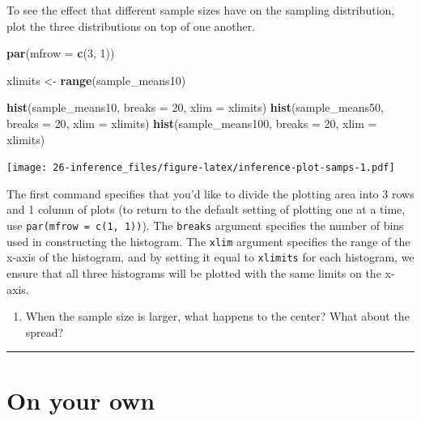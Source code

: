 \documentclass[]{book}
\newenvironment{Shaded}{\begin{snugshade}}{\end{snugshade}}
\newcommand{\KeywordTok}[1]{\textcolor[rgb]{0.13,0.29,0.53}{\textbf{{#1}}}}
\newcommand{\DataTypeTok}[1]{\textcolor[rgb]{0.13,0.29,0.53}{{#1}}}
\newcommand{\DecValTok}[1]{\textcolor[rgb]{0.00,0.00,0.81}{{#1}}}
\newcommand{\StringTok}[1]{\textcolor[rgb]{0.31,0.60,0.02}{{#1}}}
\newcommand{\NormalTok}[1]{{#1}}
\providecommand{\tightlist}{%
  \setlength{\itemsep}{0pt}\setlength{\parskip}{0pt}}
\theoremstyle{definition}
\theoremstyle{definition}
\theoremstyle{remark}
\begin{document}
To see the effect that different sample sizes have on the sampling
distribution, plot the three distributions on top of one another.

\begin{Shaded}
\begin{Highlighting}[]
\KeywordTok{par}\NormalTok{(}\DataTypeTok{mfrow =} \KeywordTok{c}\NormalTok{(}\DecValTok{3}\NormalTok{, }\DecValTok{1}\NormalTok{))}

\NormalTok{xlimits <-}\StringTok{ }\KeywordTok{range}\NormalTok{(sample_means10)}

\KeywordTok{hist}\NormalTok{(sample_means10, }\DataTypeTok{breaks =} \DecValTok{20}\NormalTok{, }\DataTypeTok{xlim =} \NormalTok{xlimits)}
\KeywordTok{hist}\NormalTok{(sample_means50, }\DataTypeTok{breaks =} \DecValTok{20}\NormalTok{, }\DataTypeTok{xlim =} \NormalTok{xlimits)}
\KeywordTok{hist}\NormalTok{(sample_means100, }\DataTypeTok{breaks =} \DecValTok{20}\NormalTok{, }\DataTypeTok{xlim =} \NormalTok{xlimits)}
\end{Highlighting}
\end{Shaded}

\texttt{[image: 26-inference\_files/figure-latex/inference-plot-samps-1.pdf]}

The first command specifies that you'd like to divide the plotting area
into 3 rows and 1 column of plots (to return to the default setting of
plotting one at a time, use \texttt{par(mfrow\ =\ c(1,\ 1))}). The
\texttt{breaks} argument specifies the number of bins used in
constructing the histogram. The \texttt{xlim} argument specifies the
range of the x-axis of the histogram, and by setting it equal to
\texttt{xlimits} for each histogram, we ensure that all three histograms
will be plotted with the same limits on the x-axis.

\begin{enumerate}
\def\labelenumi{\arabic{enumi}.}
\setcounter{enumi}{5}
\tightlist
\item
  When the sample size is larger, what happens to the center? What about
  the spread?
\end{enumerate}

\begin{center}\rule{0.5\linewidth}{\linethickness}\end{center}

\section*{On your own}\label{on-your-own-2}
\end{document}

